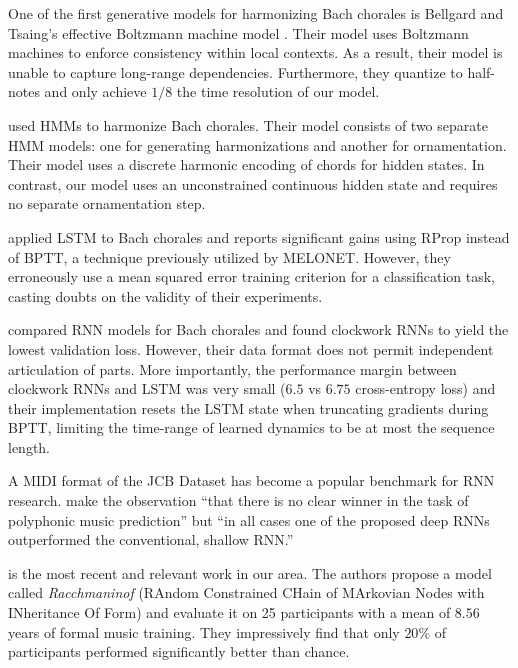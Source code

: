 One of the first generative models for harmonizing Bach chorales is Bellgard
and Tsaing's effective Boltzmann machine model \citep{bellgard1994harmonizing}. Their model
uses Boltzmann machines to enforce consistency within local contexts. As a result,
their model is unable to capture long-range dependencies. Furthermore, they quantize
to half-notes and only achieve $1/8$ the time resolution of our model.

\citet{Allan2005} used HMMs to harmonize Bach chorales. Their model consists of
two separate HMM models: one for generating harmonizations and another for
ornamentation. Their model uses a discrete harmonic encoding of chords for
hidden states. In contrast, our model uses an unconstrained continuous hidden
state and requires no separate ornamentation step.

\citet{Liu2014} applied LSTM to Bach chorales and reports significant gains
using RProp instead of BPTT, a technique previously utilized by
MELONET\citep{feulner1994melonet}. However, they erroneously use a mean squared
error training criterion for a classification task, casting doubts on the
validity of their experiments.

\citet{Brien2016} compared RNN models for Bach chorales and found clockwork RNNs to
yield the lowest validation loss. However, their data format does not permit
independent articulation of parts. More importantly, the performance margin between
clockwork RNNs and LSTM was very small ($6.5$ vs $6.75$ cross-entropy loss) and their
implementation resets the LSTM state when truncating gradients during BPTT, limiting the
time-range of learned dynamics to be at most the sequence length.

A MIDI format of the JCB Dataset has become a popular benchmark for RNN research.
\citet{pascanu2013construct} make the observation ``that there is no clear
winner in the task of polyphonic music prediction'' but ``in all cases one of
the proposed deep RNNs outperformed the conventional, shallow RNN.'' 

\citet{collins2016developing} is the most recent and relevant work in our area.
The authors propose a model called \emph{Racchmaninof} (RAndom Constrained
CHain of MArkovian Nodes with INheritance Of Form) and evaluate it on 25
participants with a mean of $8.56$ years of formal music training. They
impressively find that only $20\%$ of participants performed significantly
better than chance.
